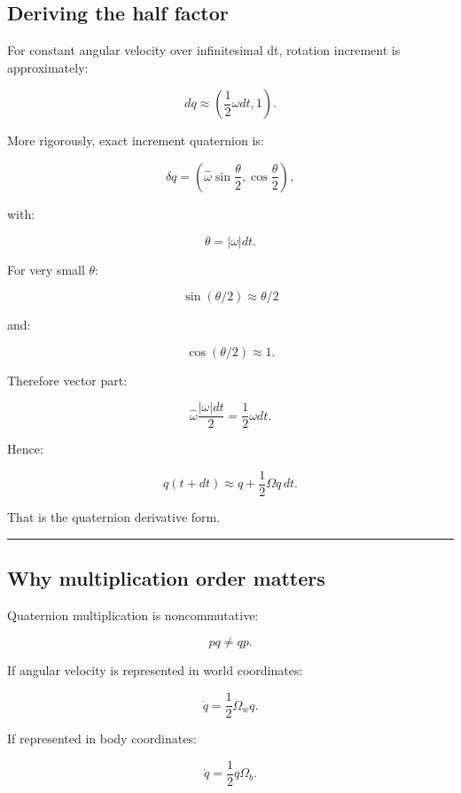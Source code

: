 \subsection{Deriving the half factor}\label{06-engine-ii-ch037-deriving-the-half-factor}

\hypertarget{06-engine-ii-ch037-deriving-the-half-factor}{}

For constant angular velocity over infinitesimal dt, rotation increment is approximately:

\[
dq
\approx
\left(
\frac12\omega dt,
1
\right).
\]

More rigorously, exact increment quaternion is:

\[
\delta q
=
\left(
\hat\omega
\sin\frac{\theta}{2},
\cos\frac{\theta}{2}
\right),
\]

with:

\[
\theta
=
|\omega|dt.
\]

For very small \(\theta\):

\[
\sin(\theta/2)
\approx
\theta/2
\]

and:

\[
\cos(\theta/2)
\approx1.
\]

Therefore vector part:

\[
\hat\omega
\frac{|\omega|dt}{2}
=
\frac12\omega dt.
\]

Hence:

\[
q(t+dt)
\approx
q+
\frac12\Omega q\,dt.
\]

That is the quaternion derivative form.

\begin{center}\rule{0.5\linewidth}{0.5pt}\end{center}

\subsection{Why multiplication order matters}\label{06-engine-ii-ch037-why-multiplication-order-matters}

\hypertarget{06-engine-ii-ch037-why-multiplication-order-matters}{}

Quaternion multiplication is noncommutative:

\[
pq\neq qp.
\]

If angular velocity is represented in world coordinates:

\[
\dot q
=
\frac12\Omega_wq.
\]

If represented in body coordinates:

\[
\dot q
=
\frac12q\Omega_b.
\]


